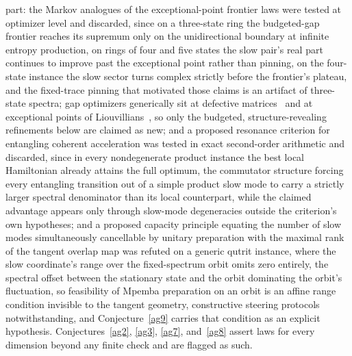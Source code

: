 \documentclass[11pt]{article}
\theoremstyle{definition}
\begin{document}
part: the Markov analogues of the exceptional-point frontier laws were tested at optimizer level and discarded, since on a three-state ring the budgeted-gap frontier reaches its supremum only on the unidirectional boundary at infinite entropy production, on rings of four and five states the slow pair's real part continues to improve past the exceptional point rather than pinning, on the four-state instance the slow sector turns complex strictly before the frontier's plateau, and the fixed-trace pinning that motivated those claims is an artifact of three-state spectra; gap optimizers generically sit at defective matrices~\cite{BLO01} and at exceptional points of Liouvillians~\cite{ZWG23}, so only the budgeted, structure-revealing refinements below are claimed as new; and a proposed resonance criterion for entangling coherent acceleration was tested in exact second-order arithmetic and discarded, since in every nondegenerate product instance the best local Hamiltonian already attains the full optimum, the commutator structure forcing every entangling transition out of a simple product slow mode to carry a strictly larger spectral denominator than its local counterpart, while the claimed advantage appears only through slow-mode degeneracies outside the criterion's own hypotheses; and a proposed capacity principle equating the number of slow modes simultaneously cancellable by unitary preparation with the maximal rank of the tangent overlap map was refuted on a generic qutrit instance, where the slow coordinate's range over the fixed-spectrum orbit omits zero entirely, the spectral offset between the stationary state and the orbit dominating the orbit's fluctuation, so feasibility of Mpemba preparation on an orbit is an affine range condition invisible to the tangent geometry, constructive steering protocols~\cite{GMS26} notwithstanding, and Conjecture~\ref{ag9} carries that condition as an explicit hypothesis.  Conjectures~\ref{ag2}, \ref{ag3}, \ref{ag7}, and~\ref{ag8} assert laws for every dimension beyond any finite check and are flagged as such.
\end{document}
